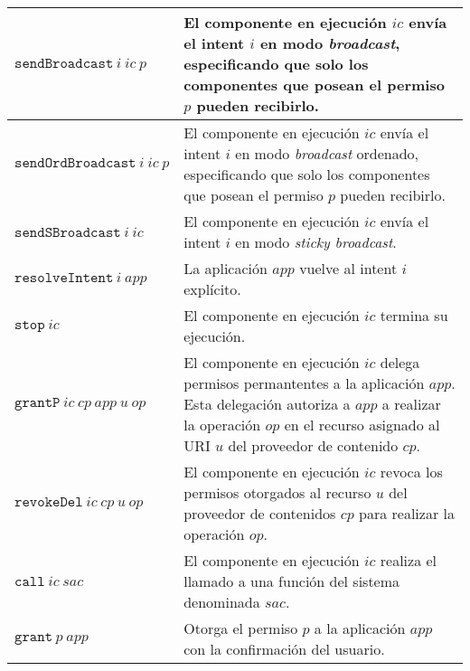 \begin{table}
\begin{tabularx}{\linewidth}{|l X|}
        \hline
        $\mathtt{sendBroadcast}~i~ic~p$    & El componente en ejecución $ic$ envía el intent $i$ en modo \textit{broadcast}, especificando que solo los componentes que posean el permiso $p$ pueden recibirlo.                                                   \\
        \hline
        $\mathtt{sendOrdBroadcast}~i~ic~p$ & El componente en ejecución $ic$ envía el intent $i$ en modo \textit{broadcast} ordenado,  especificando que solo los componentes que posean el permiso $p$ pueden recibirlo.                                         \\
        \hline
        $\mathtt{sendSBroadcast}~i~ic$     & El componente en ejecución $ic$ envía el intent $i$ en modo \textit{sticky broadcast}.                                                                                                                               \\
        \hline
        $\mathtt{resolveIntent}~i~app$     & La aplicación $app$ vuelve al intent $i$ explícito.                                                                                                                                                                  \\
        \hline
        $\mathtt{stop}~ic$                 & El componente en ejecución $ic$ termina su ejecución.                                                                                                                                                                \\
        \hline
        $\mathtt{grantP}~ic~cp~app~u~op$   & El componente en ejecución $ic$ delega permisos permantentes a la aplicación $app$. Esta delegación autoriza a $app$ a realizar la operación $op$ en el recurso asignado al URI $u$ del proveedor de contenido $cp$. \\
        \hline
        $\mathtt{revokeDel}~ic~cp~u~op$    & El componente en ejecución $ic$ revoca los permisos otorgados al recurso $u$ del proveedor de contenidos $cp$ para realizar la operación $op$.                                                                       \\
        \hline
        $\mathtt{call}~ic~sac$             & El componente en ejecución $ic$ realiza el llamado a una función del sistema denominada $sac$.                                                                                                                       \\
        \hline
        $\mathtt{grant}~p~app$             & Otorga el permiso $p$ a la aplicación $app$ con la confirmación del usuario.                                                                                                                                         \\

\end{tabularx}
\end{table}
